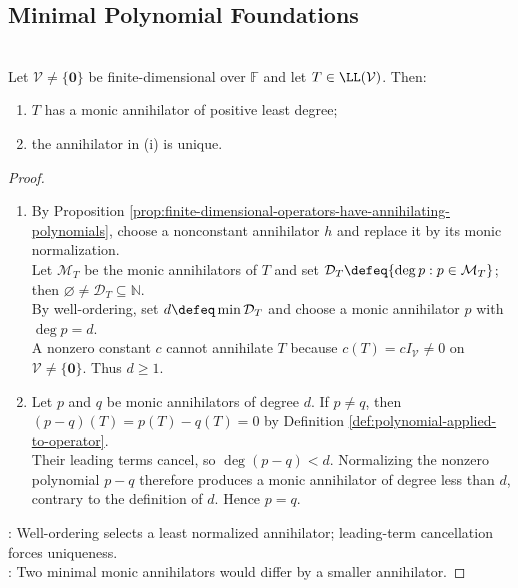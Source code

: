 \subsection{Minimal Polynomial Foundations}

\begin{theorem} \label{thm:operator-minimal-polynomial-existence} \\
Let $\mathcal{V}\neq\{\mathbf{0}\}$ be finite-dimensional over $\mathbb{F}$ and let $T\in\LL(\mathcal{V})$. Then:
\begin{enumerate}[label=(\roman*)]
\setlength{\itemsep}{0pt}
\item $T$ has a monic annihilator of positive least degree;
\item the annihilator in (i) is unique.
\end{enumerate}
\begin{proof}
\begin{enumerate}[label=(\roman*)]
\setlength{\itemsep}{0pt}
\item By Proposition \ref{prop:finite-dimensional-operators-have-annihilating-polynomials}, choose a nonconstant annihilator $h$ and replace it by its monic normalization.\\
Let $\mathcal{M}_T$ be the monic annihilators of $T$ and set $\mathcal{D}_T\defeq\{\deg p:p\in\mathcal{M}_T\}$; then $\varnothing\neq\mathcal{D}_T\subseteq\mathbb{N}$.\\
By well-ordering, set $d\defeq\min\mathcal{D}_T$ and choose a monic annihilator $p$ with $\deg p=d$.\\
A nonzero constant $c$ cannot annihilate $T$ because $c(T)=cI_{\mathcal{V}}\neq0$ on $\mathcal{V}\neq\{\mathbf{0}\}$. Thus $d\geq1$.
\item Let $p$ and $q$ be monic annihilators of degree $d$. If $p\neq q$, then $(p-q)(T)=p(T)-q(T)=0$ by Definition \ref{def:polynomial-applied-to-operator}.\\
Their leading terms cancel, so $\deg(p-q)<d$. Normalizing the nonzero polynomial $p-q$ therefore produces a monic annihilator of degree less than $d$, contrary to the definition of $d$. Hence $p=q$.
\end{enumerate}
: Well-ordering selects a least normalized annihilator; leading-term cancellation forces uniqueness.\\
: Two minimal monic annihilators would differ by a smaller annihilator.
\end{proof}
\end{theorem}

